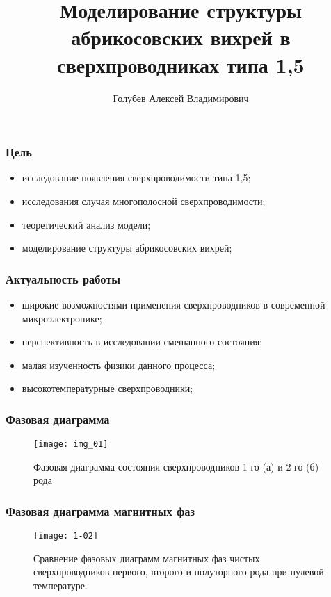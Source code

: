 \title{Моделирование структуры абрикосовских вихрей в сверхпроводниках 
    типа 1,5}
\author{Голубев Алексей Владимирович}
\date{}

\begin{frame}
    \titlepage
\end{frame}

\begin{frame}
    \frametitle{Цель}
    \begin{itemize}
        \item исследование появления сверхпроводимости типа 1,5;
        \item исследования случая многополосной сверхпроводимости;
        \item теоретический анализ модели;
        \item моделирование структуры абрикосовских вихрей;
    \end{itemize}
\end{frame}

\begin{frame}
    \frametitle{Актуальность работы}
    \begin{itemize}
        \item широкие возможностями применения сверхпроводников в 
            современной микроэлектронике;
        \item перспективность в исследовании смешанного состояния;
        \item малая изученность физики данного процесса;
        \item высокотемпературные сверхпроводники;
    \end{itemize}
\end{frame}

\begin{frame}
    \frametitle{Фазовая диаграмма}
    \begin{figure}[h]
        \center
        \texttt{[image: img\_01]}
        \caption{Фазовая диаграмма состояния сверхпроводников 1-го (а) и 
            2-го (б) рода}
    \end{figure}
\end{frame}

\begin{frame}
    \frametitle{Фазовая диаграмма магнитных фаз}
    \begin{figure}[h]
        \center
        \texttt{[image: 1-02]}
        \caption{Сравнение фазовых диаграмм магнитных фаз чистых 
            сверхпроводников первого, второго и полуторного рода при нулевой 
            температуре.}
    \end{figure}
\end{frame}

